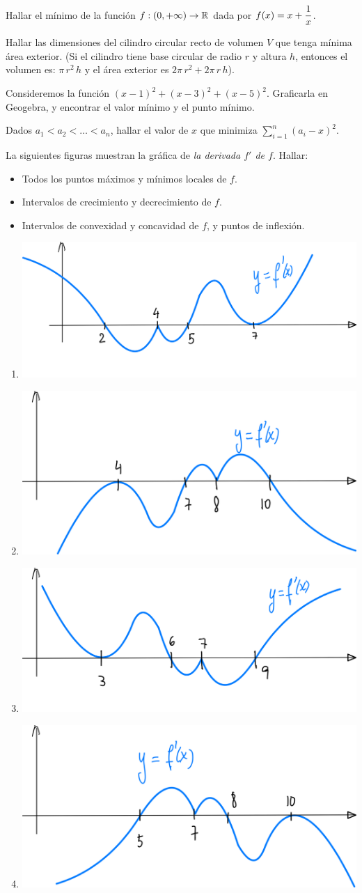 
\item Hallar el mínimo de la función $f:(0,+\infty)\to \mathbb{R}$ dada por $\displaystyle f(x) = x + \frac1x$.

\item Hallar las dimensiones del cilindro circular recto de volumen $V$ que tenga mínima área exterior. (Si el cilindro tiene base circular de radio $r$ y altura $h$, entonces el volumen es: $\pi \, r^2\, h$ y el área exterior es $2\pi \, r^2 + 2 \pi \, r\, h$).

\item Consideremos la función $(x-1)^2+(x-3)^2+(x-5)^2$. Graficarla en Geogebra, y encontrar el valor mínimo y el punto mínimo.

\item Dados $a_1<a_2<\dots <a_n$, hallar el valor de $x$ que minimiza $\sum_{i=1}^n (a_i-x)^2$.

\item La siguientes figuras muestran la gráfica de \emph{la derivada $f'$ de $f$}. Hallar:
\begin{itemize}
  \item Todos los puntos máximos y mínimos locales de $f$.
  \item Intervalos de crecimiento y decrecimiento de $f$.
  \item Intervalos de convexidad y concavidad de $f$, y puntos de inflexión.
\end{itemize} 

\begin{multicols}{2}
  \begin{enumerate}
    \item \includegraphics[width=.4\textwidth]{pics/max-min-locales-ej-a.png}
    \item \includegraphics[width=.4\textwidth]{pics/max-min-locales-ej-b.png}
    \item \includegraphics[width=.4\textwidth]{pics/max-min-locales-ej-c.png}
    \item \includegraphics[width=.4\textwidth]{pics/max-min-locales-ej-d.png}
  \end{enumerate}
  
\end{multicols}
